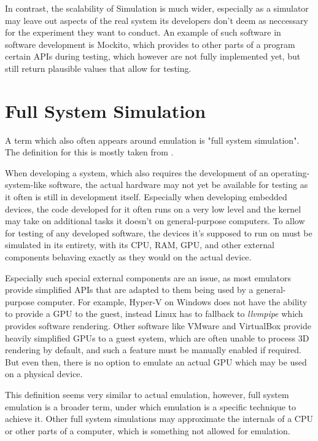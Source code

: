 In contrast, the scalability of Simulation is much wider,
especially as a simulator may leave out aspects of the real system
its developers don't deem as neccessary for the experiment they want to conduct.
An example of such software in software development is Mockito,
which provides to other parts of a program certain APIs during testing,
which however are not fully implemented yet,
but still return plausible values that allow for testing.

\section{Full System Simulation}
A term which also often appears around emulation is "full system simulation".
The definition for this is mostly taken from \cite{kitcheckpoints}.

When developing a system, which also requires the development of an operating-system-like
software, the actual hardware may not yet be available for testing
as it often is still in development itself.
Especially when developing embedded devices,
the code developed for it often runs on a very low level
and the kernel may take on additional tasks it doesn't on general-purpose computers.
To allow for testing of any developed software,
the devices it's supposed to run on must be simulated in its entirety,
with its CPU, RAM, GPU, and other external components behaving exactly as they would on the actual device.

Especially such special external components are an issue,
as most emulators provide simplified APIs that are adapted to them being used by a general-purpose computer.
For example, Hyper-V on Windows does not have the ability to provide a GPU to the guest,
instead Linux has to fallback to \emph{llvmpipe} which provides software rendering.
Other software like VMware and VirtualBox provide heavily simplified GPUs to a guest system,
which are often unable to process 3D rendering by default,
and such a feature must be manually enabled if required.
But even then, there is no option to emulate an actual GPU which may be used on a physical device.

This definition seems very similar to actual emulation,
however, full system emulation is a broader term, under which emulation is a specific technique to achieve it.
Other full system simulations may approximate the internals of a CPU or other parts of a computer,
which is something not allowed for emulation.

